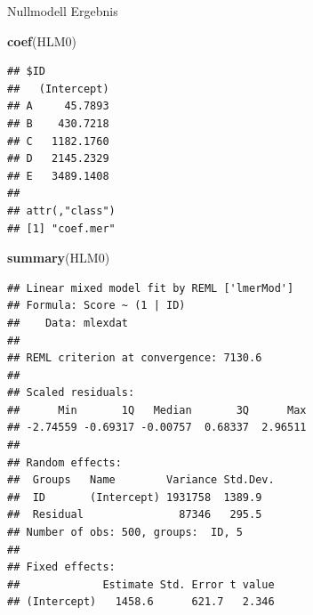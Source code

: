 \documentclass[ignorenonframetext,]{beamer}
\newenvironment{Shaded}{}{}
\newcommand{\KeywordTok}[1]{\textcolor[rgb]{0.00,0.44,0.13}{\textbf{{#1}}}}
\newcommand{\NormalTok}[1]{{#1}}
\begin{document}
\begin{frame}[fragile]{Nullmodell Ergebnis}

\begin{Shaded}
\begin{Highlighting}[]
\KeywordTok{coef}\NormalTok{(HLM0)}
\end{Highlighting}
\end{Shaded}

\begin{verbatim}
## $ID
##   (Intercept)
## A     45.7893
## B    430.7218
## C   1182.1760
## D   2145.2329
## E   3489.1408
## 
## attr(,"class")
## [1] "coef.mer"
\end{verbatim}

\begin{Shaded}
\begin{Highlighting}[]
\KeywordTok{summary}\NormalTok{(HLM0)}
\end{Highlighting}
\end{Shaded}

\begin{verbatim}
## Linear mixed model fit by REML ['lmerMod']
## Formula: Score ~ (1 | ID)
##    Data: mlexdat
## 
## REML criterion at convergence: 7130.6
## 
## Scaled residuals: 
##      Min       1Q   Median       3Q      Max 
## -2.74559 -0.69317 -0.00757  0.68337  2.96511 
## 
## Random effects:
##  Groups   Name        Variance Std.Dev.
##  ID       (Intercept) 1931758  1389.9  
##  Residual               87346   295.5  
## Number of obs: 500, groups:  ID, 5
## 
## Fixed effects:
##             Estimate Std. Error t value
## (Intercept)   1458.6      621.7   2.346
\end{verbatim}

\end{frame}
\end{document}
